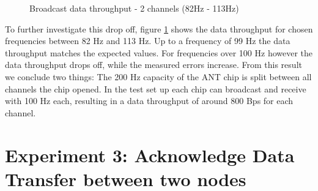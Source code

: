 \begin{description}
\begin{figure}[H]
			\caption{Broadcast data throughput - 2 channels (82Hz - 113Hz)}\label{fig:exp2high}
		\end{figure}
	To further investigate this drop off, figure \ref{fig:exp2high} shows the data throughput for chosen frequencies between 82 Hz and 113 Hz. Up to a frequency of 99 Hz the data throughput matches the expected values. For frequencies over 100 Hz however the data throughput drops off, while the measured errors increase. From this result we conclude two things: The 200 Hz capacity of the ANT chip is split between all channels the chip opened. In the test set up each chip can broadcast and receive with 100 Hz each, resulting in a data throughput of around 800 Bps for each channel. 	
\end{description}
\newpage


\section{Experiment 3: Acknowledge Data Transfer between two nodes}

